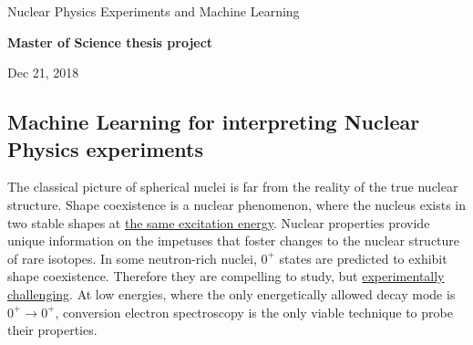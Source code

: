 \documentclass[%
oneside,                 %
final,                   %
10pt]{article}
\begin{document}

\newcommand{\exercisesection}[1]{\subsection*{#1}}






\thispagestyle{empty}

\begin{center}
{\LARGE\bf
\begin{spacing}{1.25}
Nuclear Physics Experiments and  Machine Learning
\end{spacing}
}
\end{center}


\begin{center}
{\bf Master of Science thesis project${}^{}$} \\ [0mm]
\end{center}

\begin{center}
\end{center}
    

\begin{center}
Dec 21, 2018
\end{center}

\vspace{1cm}


\subsection{Machine Learning for interpreting Nuclear Physics experiments}



The classical picture of spherical nuclei is far from the reality of the
true nuclear structure. Shape coexistence is a nuclear phenomenon, where
the nucleus exists in two stable shapes at \href{{https://www.europhysicsnews.org/articles/epn/pdf/2001/01/epn01101.pdf}}{the same excitation energy}.
Nuclear properties provide unique information on the impetuses that
foster changes to the nuclear structure of rare isotopes. In some
neutron-rich nuclei, $0^{+}$ states are predicted to exhibit shape
coexistence. Therefore they are compelling to study, but \href{{http://iopscience.iop.org/article/10.1088/0954-3899/43/2/024001}}{experimentally
challenging}.
At low energies, where the only energetically allowed decay mode is
$0^{+} \rightarrow 0^{+}$, conversion electron spectroscopy is the
only viable technique to probe their properties.
\end{document}
